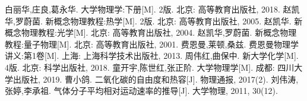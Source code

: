 \begin{thebibliography}{99}%
    白丽华,庄良,葛永华. 大学物理学:下册[M]. 2版. 北京: 高等教育出版社, 2018.
    赵凯华,罗蔚菌. 新概念物理教程:热学[M]. 2版. 北京: 高等教育出版社, 2005.
    赵凯华. 新概念物理教程:光学[M]. 北京: 高等教育出版社, 2004.
    赵凯华,罗蔚菌. 新概念物理教程:量子物理[M]. 北京: 高等教育出版社, 2001.
    费恩曼,莱顿,桑兹. 费恩曼物理学讲义:第1卷[M]. 上海: 上海科学技术出版社, 2013.
    周伟红,曲保中. 新大学化学[M]. 4版. 北京: 科学出版社, 2018.
    童开宇,陈世红,张正阶. 大学物理学[M]. 成都: 四川大学出版社, 2019.
    曹小鸽. 二氧化碳的自由度和热容[J]. 物理通报, 2017(2).
    刘伟涛,张婷,李承祖. 气体分子平均相对运动速率的推导[J]. 大学物理, 2011, 30(12).
\end{thebibliography}